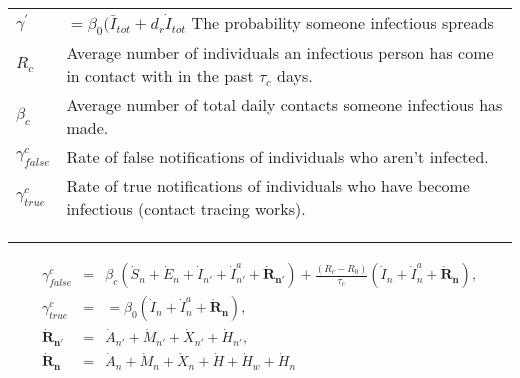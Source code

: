 \documentclass{article}
\begin{document}
\begin{table}[]
\begin{tabular}{ll}
$\gamma^{'}$                & $=\beta_{0} (\bar{I}_{tot} + d_{r} \dot{I}_{tot}$  The probability someone infectious spreads      \\
$R_{c}$             & Average number of individuals an infectious person has come in contact with in the past $\tau_{c}$ days. \\
$\beta_{c}$                 & Average number of total daily contacts someone infectious has made.                                \\
$\gamma^{c}_{false}$        & Rate of false notifications of individuals who aren't infected.                                    \\
$\gamma^{c}_{true}$ & Rate of true notifications of individuals who have become infectious (contact tracing works).            \\
                            &                                                                                                    \\
                            &                                                                                                    \\
                            &                                                                                                   
\end{tabular}
\end{table}

\begin{eqnarray}
\gamma^{c}_{false} &=& \beta_{c} (\dot{S}_{n} + \dot{E}_{n} + \dot{I}_{n'} + \dot{I}^{a}_{n'} + \boldsymbol{\dot{R}_{n'}}) + \frac{(R_{c}-R_{0})}{\tau_{c}}(\dot{I}_{n} + \dot{I}^{a}_{n} + \boldsymbol{\dot{R}_{n}}), \\
%
\gamma^{c}_{true} &=& =\beta_{0} (\dot{I}_{n} + \dot{I}^{a}_{n} + \boldsymbol{\dot{R}_{n}}), \\ 
%
\boldsymbol{\dot{R}_{n'}} &=& \dot{A}_{n'} + \dot{M}_{n'} + \dot{X}_{n'} + \dot{H}_{n'}, \\
%
\boldsymbol{\dot{R}_{n}} &=& \dot{A}_{n} + \dot{M}_{n} + \dot{X}_{n} + \dot{H} + \dot{H}_{w} + \dot{H}_{n}
\end{eqnarray}
\end{document}
